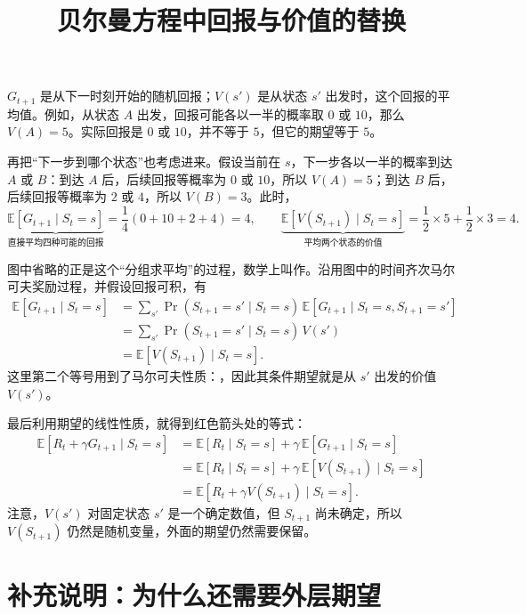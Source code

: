 \documentclass[UTF8]{ctexart}
\title{贝尔曼方程中回报与价值的替换}
\author{}
\date{}
\begin{document}
\maketitle

 \(G_{t+1}\) 是从下一时刻开始的随机回报；\(V(s')\) 是从状态 \(s'\) 出发时，这个回报的平均值。例如，从状态 \(A\) 出发，回报可能各以一半的概率取 \(0\) 或 \(10\)，那么 \(V(A)=5\)。实际回报是 \(0\) 或 \(10\)，并不等于 \(5\)，但它的期望等于 \(5\)。

再把“下一步到哪个状态”也考虑进来。假设当前在 \(s\)，下一步各以一半的概率到达 \(A\) 或 \(B\)：到达 \(A\) 后，后续回报等概率为 \(0\) 或 \(10\)，所以 \(V(A)=5\)；到达 \(B\) 后，后续回报等概率为 \(2\) 或 \(4\)，所以 \(V(B)=3\)。此时，
\[
\underbrace{\mathbb E[G_{t+1}\mid S_t=s]}_{\text{直接平均四种可能的回报}}
=\frac14(0+10+2+4)=4,
\qquad
\underbrace{\mathbb E[V(S_{t+1})\mid S_t=s]}_{\text{平均两个状态的价值}}
=\frac12\times5+\frac12\times3=4.
\]

图中省略的正是这个“分组求平均”的过程，数学上叫作。沿用图中的时间齐次马尔可夫奖励过程，并假设回报可积，有
\[
\begin{aligned}
\mathbb E[G_{t+1}\mid S_t=s]
&=\sum_{s'}\Pr(S_{t+1}=s'\mid S_t=s)\,
  \mathbb E[G_{t+1}\mid S_t=s,S_{t+1}=s']\\
&=\sum_{s'}\Pr(S_{t+1}=s'\mid S_t=s)\,V(s')\\
&=\mathbb E[V(S_{t+1})\mid S_t=s].
\end{aligned}
\]
这里第二个等号用到了马尔可夫性质：，因此其条件期望就是从 \(s'\) 出发的价值 \(V(s')\)。

最后利用期望的线性性质，就得到红色箭头处的等式：
\[
\begin{aligned}
\mathbb E[R_t+\gamma G_{t+1}\mid S_t=s]
&=\mathbb E[R_t\mid S_t=s]
  +\gamma\,\mathbb E[G_{t+1}\mid S_t=s]\\
&=\mathbb E[R_t\mid S_t=s]
  +\gamma\,\mathbb E[V(S_{t+1})\mid S_t=s]\\
&=\mathbb E[R_t+\gamma V(S_{t+1})\mid S_t=s].
\end{aligned}
\]
注意，\(V(s')\) 对固定状态 \(s'\) 是一个确定数值，但 \(S_{t+1}\) 尚未确定，所以 \(V(S_{t+1})\) 仍然是随机变量，外面的期望仍然需要保留。

\section*{补充说明：为什么还需要外层期望}
\end{document}
